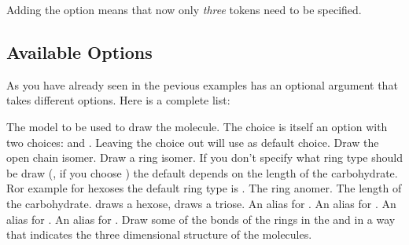 \documentclass[load-preamble+,scrartcl={DIV10}]{cnltx-doc}
\begin{document}
\begin{example}
  \setatomsep{2.5em}\chemnameinit{}
\end{example}

Adding the option  means that now only \emph{three} tokens
need to be specified.

\begin{example}
  \setatomsep{2.5em}\chemnameinit{}
\end{example}

\subsection{Available Options}
As you have already seen in the pevious examples  has an
optional argument that takes different options.  Here is a complete list:
\begin{options}
    The model to be used to draw the molecule.  The choice 
    is itself an option with two choices:  and
    .  Leaving the choice out will use  as
    default choice.
    Draw the open chain isomer.
    Draw a ring isomer.  If you don't specify what ring type should be draw
    (\ie, if you choose ) the default depends on the length of the
    carbohydrate.  Ror example for hexoses the default ring type is
    .
    The ring anomer.
    The length of the carbohydrate.   draws a hexose,
     draws a triose.
    An alias for .
    An alias for .
   An alias for .
    An alias for .
    Draw some of the bonds of the rings in the  and 
    in a way that indicates the three dimensional structure of the molecules.
\end{options}
\end{document}
